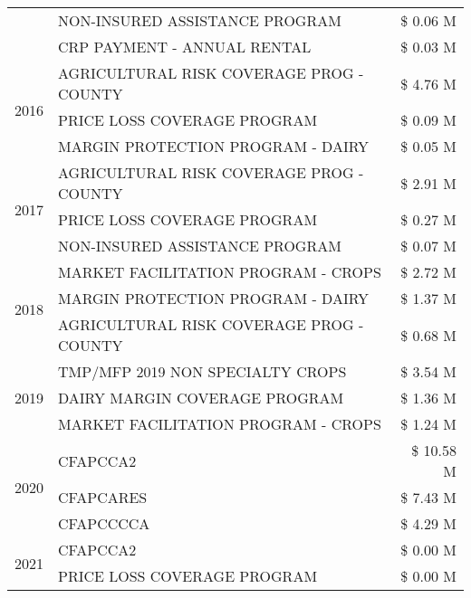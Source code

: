 \begin{tabular}{llr}
 & NON-INSURED ASSISTANCE PROGRAM & \$ 0.06 M \\
 & CRP PAYMENT - ANNUAL RENTAL & \$ 0.03 M \\
\cline{1-3}
\multirow[t]{3}{*}{2016} & AGRICULTURAL RISK COVERAGE PROG - COUNTY & \$ 4.76 M \\
 & PRICE LOSS COVERAGE PROGRAM & \$ 0.09 M \\
 & MARGIN PROTECTION PROGRAM - DAIRY & \$ 0.05 M \\
\cline{1-3}
\multirow[t]{3}{*}{2017} & AGRICULTURAL RISK COVERAGE PROG - COUNTY & \$ 2.91 M \\
 & PRICE LOSS COVERAGE PROGRAM & \$ 0.27 M \\
 & NON-INSURED ASSISTANCE PROGRAM & \$ 0.07 M \\
\cline{1-3}
\multirow[t]{3}{*}{2018} & MARKET FACILITATION PROGRAM - CROPS & \$ 2.72 M \\
 & MARGIN PROTECTION PROGRAM - DAIRY & \$ 1.37 M \\
 & AGRICULTURAL RISK COVERAGE PROG - COUNTY & \$ 0.68 M \\
\cline{1-3}
\multirow[t]{3}{*}{2019} & TMP/MFP 2019 NON SPECIALTY CROPS & \$ 3.54 M \\
 & DAIRY MARGIN COVERAGE PROGRAM & \$ 1.36 M \\
 & MARKET FACILITATION PROGRAM - CROPS & \$ 1.24 M \\
\cline{1-3}
\multirow[t]{3}{*}{2020} & CFAPCCA2 & \$ 10.58 M \\
 & CFAPCARES & \$ 7.43 M \\
 & CFAPCCCCA & \$ 4.29 M \\
\cline{1-3}
\multirow[t]{2}{*}{2021} & CFAPCCA2 & \$ 0.00 M \\
 & PRICE LOSS COVERAGE PROGRAM & \$ 0.00 M \\
\cline{1-3}
\bottomrule
\end{tabular}
